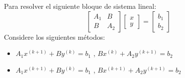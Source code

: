Para resolver el siguiente bloque de sistema lineal:
\[
    \begin{bmatrix}
    A_{1} & B\\
    B & A_{2}
    \end{bmatrix}
    \begin{bmatrix}
    x\\ 
    y 
    \end{bmatrix} = 
    \begin{bmatrix}
    b_{1}\\ 
    b_{2}
    \end{bmatrix}
\]
Considere los siguientes métodos:\\
\begin{itemize}
    \item $ A_{1}x^{(k + 1)} + By^{(k)} =  b_{1}$ , $Bx^{(k)} + A_{2}y^{(k + 1)} =  b_{2}$ 
    \item $ A_{1}x^{(k + 1)} + By^{(k)} =  b_{1}$ , $Bx^{(k + 1)} + A_{2}y^{(k + 1)} =  b_{2}$ 
\end{itemize}

